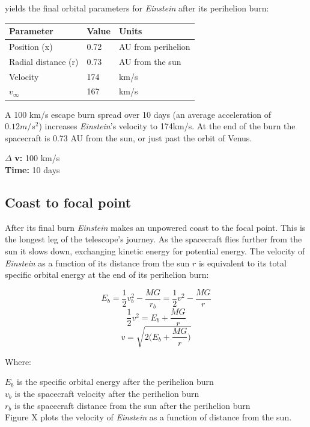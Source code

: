 \documentclass[12pt]{article} %
\begin{document}
yields the final orbital parameters for \textit{Einstein} after its perihelion burn:

\begin{center}
\begin{tabular}{|m{5 cm}| m{5 cm}| m{5 cm}|} \hline
\textbf{Parameter} & \textbf{Value} & \textbf{Units}\\ \hline
Position (x) & 0.72 & AU from perihelion\\ \hline
Radial distance (r) & 0.73& AU from the sun\\ \hline
Velocity      &  174 & km/s\\ \hline
$v_{\infty}$     &  167& km/s\\ \hline
\end{tabular}
\end{center}

A 100 km/s escape burn spread over 10 days (an average acceleration of $0.12m/s^2$) increases \textit{Einstein}'s velocity to 174km/s. At the end of the burn the spacecraft is 0.73 AU from the sun, or just past the orbit of Venus.


$\Delta$ \textbf{v:} 100 km/s\\
\textbf{Time:} 10 days\\

\subsection{Coast to focal point}
After its final burn \textit{Einstein} makes an unpowered coast to the focal point. This is the longest leg of the telescope's journey. As the spacecraft flies further from the sun it slows down, exchanging kinetic energy for potential energy. The velocity of \textit{Einstein} as a function of its distance from the sun $r$ is equivalent to its total specific orbital energy at the end of its perihelion burn:

$$E_{b} = \frac{1}{2}v_b^2 - \frac{MG}{r_b} = \frac{1}{2}v^2-\frac{MG}{r}$$
$$\frac{1}{2}v^2 = E_b+\frac{MG}{r}$$
$$\boxed{v = \sqrt{2\big(E_b + \frac{MG}{r}\big)}}$$

Where:

$E_b$ is the specific orbital energy after the perihelion burn\\
$v_b$ is the spacecraft velocity after the perihelion burn\\
$r_b$ is the spacecraft distance from the sun after the perihelion burn\\

Figure X plots the velocity of \textit{Einstein} as a function of distance from the sun.
\end{document}
